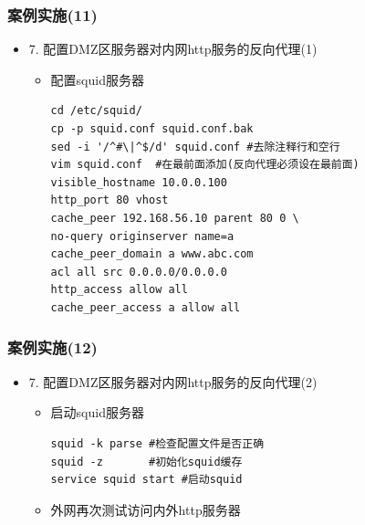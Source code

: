 \documentclass[xcolor=svgnames,presentation]{beamer}
\begin{document}
\begin{frame}[fragile]
\frametitle{案例实施(11)}
\label{sec-5-13}
\begin{itemize}

\item 7. 配置DMZ区服务器对内网http服务的反向代理(1)
\label{sec-5-13-1}%
\begin{itemize}

\item 配置squid服务器\\
\label{sec-5-13-1-1}%
\begin{verbatim}
cd /etc/squid/
cp -p squid.conf squid.conf.bak
sed -i '/^#\|^$/d' squid.conf #去除注释行和空行
vim squid.conf  #在最前面添加(反向代理必须设在最前面)
visible_hostname 10.0.0.100
http_port 80 vhost
cache_peer 192.168.56.10 parent 80 0 \
no-query originserver name=a
cache_peer_domain a www.abc.com
acl all src 0.0.0.0/0.0.0.0
http_access allow all
cache_peer_access a allow all
\end{verbatim}
\end{itemize} %
\end{itemize} %
\end{frame}
\begin{frame}[fragile]
\frametitle{案例实施(12)}
\label{sec-5-14}
\begin{itemize}

\item 7. 配置DMZ区服务器对内网http服务的反向代理(2)
\label{sec-5-14-1}%
\begin{itemize}

\item 启动squid服务器\\
\label{sec-5-14-1-1}%
\begin{verbatim}
squid -k parse #检查配置文件是否正确
squid -z       #初始化squid缓存
service squid start #启动squid
\end{verbatim}

\item 外网再次测试访问内外http服务器
\label{sec-5-14-1-2}%
\end{itemize} %
\end{itemize} %
\end{frame}
\end{document}
